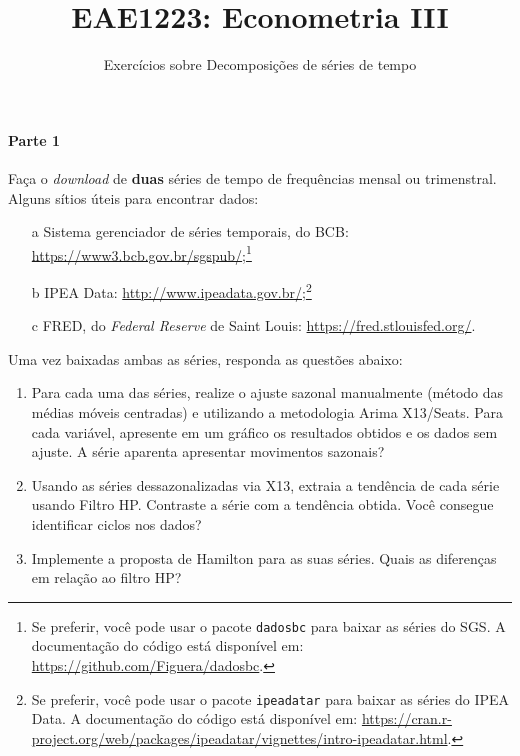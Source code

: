 \documentclass[10pt,a4paper]{article}
\title{\large EAE1223: Econometria III}
\author{\normalsize Exercícios sobre Decomposições de séries de tempo}
\date{}
\begin{document}
	\maketitle
	
	\paragraph{Parte 1} Faça o \textit{download} de \textbf{duas} séries de tempo de frequências mensal ou trimenstral. Alguns sítios úteis para encontrar dados: 
	\begin{enumerate}
		\item[a]  Sistema gerenciador de séries temporais, do BCB: \url{https://www3.bcb.gov.br/sgspub/};\footnote{Se preferir, você pode usar o pacote \texttt{dadosbc} para baixar as séries do SGS. A documentação do código está disponível em: \url{https://github.com/Figuera/dadosbc}. }
		\item[b] IPEA Data: \url{http://www.ipeadata.gov.br/};\footnote{Se preferir, você pode usar o pacote \texttt{ipeadatar} para baixar as séries do IPEA Data. A documentação do código está disponível em: \url{https://cran.r-project.org/web/packages/ipeadatar/vignettes/intro-ipeadatar.html}. }
		\item[c] FRED, do \textit{Federal Reserve} de Saint Louis: \url{https://fred.stlouisfed.org/}.
	\end{enumerate}
	Uma vez baixadas ambas as séries, responda as questões abaixo:
	\begin{enumerate}
		\item Para cada uma das séries, realize o ajuste sazonal manualmente (método das médias móveis centradas) e utilizando a metodologia Arima X13/Seats. Para cada variável, apresente em um gráfico os resultados obtidos e os dados sem ajuste. A série aparenta apresentar movimentos sazonais?
		\item Usando as séries dessazonalizadas via X13, extraia a tendência de cada série usando Filtro HP. Contraste a série com a tendência obtida. Você consegue identificar ciclos nos dados?
		\item Implemente a proposta de Hamilton para as suas séries. Quais as diferenças em relação ao filtro HP?
		
	
	\end{enumerate}
\end{document}
